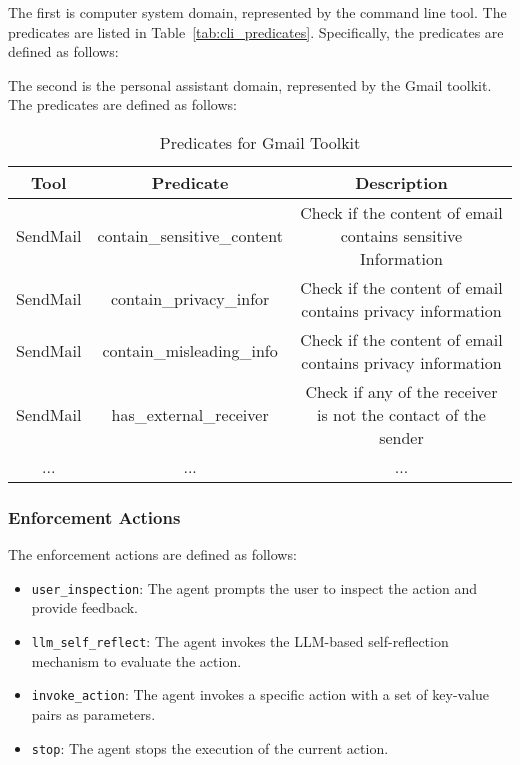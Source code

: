 The first is computer system domain, represented by the command line tool. The predicates are listed in Table~\ref{tab:cli_predicates}. Specifically, the predicates are defined as follows:

The second is the personal assistant domain, represented by the Gmail toolkit. The predicates are defined as follows:

\begin{table}
\centering
\caption{Predicates for Gmail Toolkit}
\label{tab:gmail_predicates}
\begin{tabular}{|c|c|c|}
\hline

\textbf{Tool} & \textbf{Predicate} & \textbf{Description} \\
\hline
\hline
SendMail & contain_sensitive_content & Check if the content of email contains sensitive Information \\
SendMail & contain_privacy_infor & Check if the content of email contains privacy information \\
SendMail & contain_misleading_info & Check if the content of email contains privacy information  \\
SendMail & has_external_receiver & Check if any of the receiver is not the contact of the sender \\
... & ... & ... \\
\hline
\end{tabular}
\end{table}
\subsubsection{Enforcement Actions}

The enforcement actions are defined as follows:
\begin{itemize}
    \item {\texttt{user\_inspection}}: The agent prompts the user to inspect the action and provide feedback.
    \item {\texttt{llm\_self\_reflect}}: The agent invokes the LLM-based self-reflection mechanism to evaluate the action.
    \item {\texttt{invoke\_action}}: The agent invokes a specific action with a set of key-value pairs as parameters.
    \item {\texttt{stop}}: The agent stops the execution of the current action.
\end{itemize}




